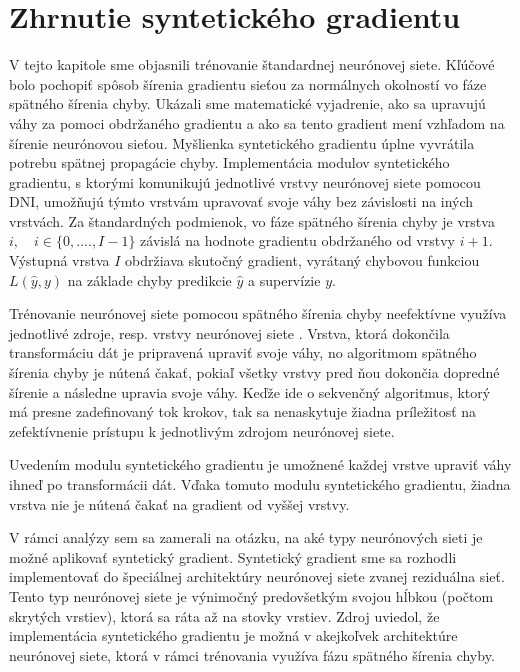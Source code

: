 \section{Zhrnutie syntetického gradientu}
\label{SGzhrnutie}
V tejto kapitole sme objasnili trénovanie štandardnej neurónovej siete. Kľúčové bolo pochopiť spôsob šírenia gradientu sieťou za normálnych okolností vo fáze spätného šírenia chyby. Ukázali sme matematické vyjadrenie, ako sa upravujú váhy za pomoci obdržaného gradientu a ako sa tento gradient mení vzhľadom na šírenie neurónovou sieťou. Myšlienka syntetického gradientu úplne vyvrátila potrebu spätnej propagácie chyby. Implementácia modulov syntetického gradientu, s ktorými komunikujú jednotlivé vrstvy neurónovej siete pomocou DNI, umožňujú týmto vrstvám upravovať svoje váhy bez závislosti na iných vrstvách. Za štandardných podmienok, vo fáze spätného šírenia chyby je vrstva $i,\quad i \in \{0,....,I-1\}$ závislá na hodnote gradientu obdržaného od vrstvy $i+1$. Výstupná vrstva $I$ obdržiava skutočný gradient, vyrátaný chybovou funkciou $L(\hat{y}, y)$ na základe chyby predikcie $\hat{y}$ a supervízie $y$. 

Trénovanie neurónovej siete pomocou spätného šírenia chyby neefektívne využíva jednotlivé zdroje, resp. vrstvy neurónovej siete \cite{Jaderberg2016}. Vrstva, ktorá dokončila transformáciu dát je pripravená upraviť svoje váhy, no algoritmom spätného šírenia chyby je nútená čakať, pokiaľ všetky vrstvy pred ňou dokončia dopredné šírenie a následne upravia svoje váhy. Keďže ide o sekvenčný algoritmus, ktorý má presne zadefinovaný tok krokov, tak sa nenaskytuje žiadna príležitosť na zefektívnenie prístupu k jednotlivým zdrojom neurónovej siete. 

Uvedením modulu syntetického gradientu je umožnené každej vrstve upraviť váhy ihneď po transformácii dát. Vďaka tomuto modulu syntetického gradientu, žiadna vrstva nie je nútená čakať na gradient od vyššej vrstvy.  

V rámci analýzy sem sa zamerali na otázku, na aké typy neurónových sieti je možné aplikovať syntetický gradient. Syntetický gradient sme sa rozhodli implementovať do špeciálnej architektúry neurónovej siete zvanej reziduálna sieť. Tento typ neurónovej siete je výnimočný predovšetkým svojou hĺbkou (počtom skrytých vrstiev), ktorá sa ráta až na stovky vrstiev. Zdroj \cite{Jaderberg2016} uviedol, že implementácia syntetického gradientu je možná v akejkoľvek architektúre neurónovej siete, ktorá v rámci trénovania využíva fázu spätného šírenia chyby. 

